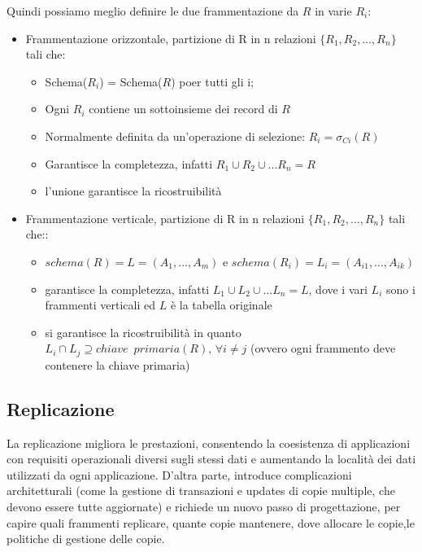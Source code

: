 Quindi possiamo meglio definire le due frammentazione da $R$ in varie $R_i$:
\begin{itemize}
    \item Frammentazione orizzontale, partizione di R in n relazioni $\{R_1, R_2, \dots, R_n\}$ tali che:
    \begin{itemize}
        \item Schema($R_i$) = Schema($R$) poer tutti gli i;
        \item Ogni $R_i$ contiene un sottoinsieme dei record di $R$
        \item Normalmente definita da un’operazione di selezione: $R_i = \sigma_{Ci}(R)$
        \item Garantisce la completezza, infatti $R_1\cup R_2\cup\ldots R_n=R$
        \item l'unione garantisce la ricostruibilità
    \end{itemize}
    \item Frammentazione verticale, partizione di R in n relazioni $\{R_1, R_2, \dots, R_n\}$ tali che::
    \begin{itemize}
        \item $schema(R) = L =(A_1,\ldots,A _m)$ e $schema(R_i) = L_i = (A_{i1},\ldots,A_{ik})$ 
        \item garantisce la completezza, infatti $L_1\cup L_2\cup\ldots L_n=L$, dove i vari $L_i$ sono i frammenti verticali ed $L$ è la tabella originale
        \item si garantisce la ricostruibilità in quanto $L_i\cap L_j \supseteq chiave\,\,\,primaria(R),\,\forall i\neq j$ (ovvero ogni frammento deve contenere la chiave primaria)
  \end{itemize}
\end{itemize}

\subsection{Replicazione}

La replicazione migliora le prestazioni, consentendo la coesistenza di applicazioni con requisiti operazionali diversi sugli stessi dati e aumentando la località dei dati utilizzati da ogni applicazione. D’altra parte, introduce complicazioni architetturali (come la gestione di transazioni e updates di copie multiple, che devono essere tutte aggiornate) e richiede un nuovo passo di progettazione, per capire quali frammenti replicare, quante copie mantenere, dove allocare le copie,le politiche di gestione delle copie.

